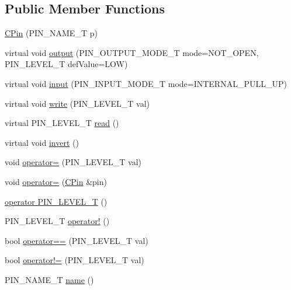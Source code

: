 \subsection*{Public Member Functions}
\begin{DoxyCompactItemize}
\item 
\hyperlink{class_c_pin_a7338f2960b4d8992c43f3c6067742ded}{C\-Pin} (P\-I\-N\-\_\-\-N\-A\-M\-E\-\_\-\-T p)
\item 
virtual void \hyperlink{class_c_pin_a84cd9c4613a9b53f00e52c23b4eed050}{output} (P\-I\-N\-\_\-\-O\-U\-T\-P\-U\-T\-\_\-\-M\-O\-D\-E\-\_\-\-T mode=N\-O\-T\-\_\-\-O\-P\-E\-N, P\-I\-N\-\_\-\-L\-E\-V\-E\-L\-\_\-\-T def\-Value=L\-O\-W)
\item 
virtual void \hyperlink{class_c_pin_a21aa5b473c1a3637a487c7724f8b9fcf}{input} (P\-I\-N\-\_\-\-I\-N\-P\-U\-T\-\_\-\-M\-O\-D\-E\-\_\-\-T mode=I\-N\-T\-E\-R\-N\-A\-L\-\_\-\-P\-U\-L\-L\-\_\-\-U\-P)
\item 
virtual void \hyperlink{class_c_pin_a1fc3486f4afea4de56ae677c20600551}{write} (P\-I\-N\-\_\-\-L\-E\-V\-E\-L\-\_\-\-T val)
\item 
virtual P\-I\-N\-\_\-\-L\-E\-V\-E\-L\-\_\-\-T \hyperlink{class_c_pin_a02060b0c9bbf0f75dead7bef1c75ce6b}{read} ()
\item 
virtual void \hyperlink{class_c_pin_a240de24c726724aeda90bfacf1d50cc5}{invert} ()
\item 
void \hyperlink{class_c_pin_a7d125bef83689d0f1db13b3f1acbd05e}{operator=} (P\-I\-N\-\_\-\-L\-E\-V\-E\-L\-\_\-\-T val)
\item 
void \hyperlink{class_c_pin_a01428eca1b98e2e194bd0848b3eb8904}{operator=} (\hyperlink{class_c_pin}{C\-Pin} \&pin)
\item 
\hyperlink{class_c_pin_a9037649d1e88192f5fde46b810c71299}{operator P\-I\-N\-\_\-\-L\-E\-V\-E\-L\-\_\-\-T} ()
\item 
P\-I\-N\-\_\-\-L\-E\-V\-E\-L\-\_\-\-T \hyperlink{class_c_pin_a5ec08fca85a5f9472e82588a6a895b8f}{operator!} ()
\item 
bool \hyperlink{class_c_pin_ae9f57493334eeb6e69a77a0cf4e50f95}{operator==} (P\-I\-N\-\_\-\-L\-E\-V\-E\-L\-\_\-\-T val)
\item 
bool \hyperlink{class_c_pin_aae98a7d34d72ccc58b6d799f7ad2e12e}{operator!=} (P\-I\-N\-\_\-\-L\-E\-V\-E\-L\-\_\-\-T val)
\item 
P\-I\-N\-\_\-\-N\-A\-M\-E\-\_\-\-T \hyperlink{class_c_pin_a5e6cdf81b6a8869e3c1e78dffb6ddca5}{name} ()
\end{DoxyCompactItemize}


